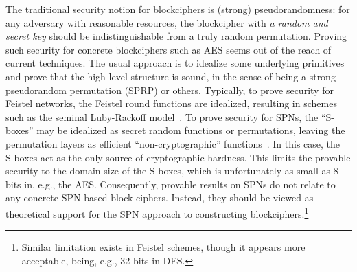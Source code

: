 


The traditional security notion for blockciphers is (strong) pseudorandomness: for any adversary with reasonable resources, the blockcipher with {\it a random and secret key} should be indistinguishable from a truly random
permutation. Proving such security for concrete blockciphers such as AES
seems out of the reach of current techniques. The usual approach is to idealize some underlying primitives and prove that the high-level structure is sound, in the sense of being a strong pseudorandom permutation (SPRP) or others. Typically, to prove security for Feistel networks, the Feistel round functions are idealized, resulting in schemes such as the seminal Luby-Rackoff model~\cite{DBLP:journals/siamcomp/LubyR88,EC:MauPie03,C:patarin03,C:patarin04,C:HoaRog10,JC:CHKPST16}. To prove security for SPNs, the ``S-boxes'' may be idealized as secret random functions or permutations, leaving the permutation layers as efficient ``non-cryptographic'' functions~\cite{FSE:IwaKur00,miles2015substitution}. In this case, the S-boxes act as the only source of cryptographic hardness. This limits the provable security to the domain-size of the S-boxes, which is unfortunately as small as 8 bits in, e.g., the AES. Consequently, provable results on SPNs do not relate to any concrete SPN-based block ciphers. Instead, they should be viewed as theoretical support for the SPN approach to constructing blockciphers.\footnote{Similar limitation exists in Feistel schemes, though it appears more acceptable, being, e.g., 32 bits in DES.}


